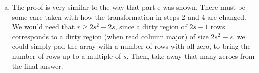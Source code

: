 \documentclass{article}
\begin{document}
\begin{enumerate}[a.]
\item

The proof is very similar to the way that part e was shown. There must be some care taken with how the transformation in steps 2 and 4 are changed. We would need that $r\ge 2s^2-2s$, since a dirty region of $2s-1$ rows corresponds to a dirty region (when read column major) of size $2s^2-s$. we could simply pad the array with a number of rows with all zero, to bring the number of rows up to a multiple of $s$. Then, take away that many zeroes from the final answer.

\end{enumerate}
\end{document}
